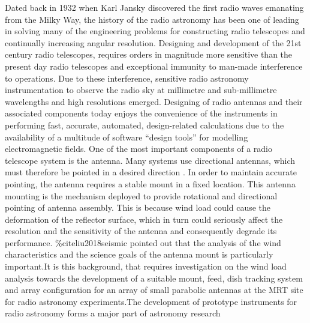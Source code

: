 {Dated back in 1932 \cite{jansky1933radio} 
when Karl Jansky discovered the first radio waves emanating from the Milky Way, the history of the radio astronomy has been one of leading in solving many of the engineering problems for constructing radio telescopes and  continually increasing angular resolution.
Designing and development of the 21st century radio telescopes, requires orders in magnitude more sensitive than the present day radio telescopes and exceptional immunity to man-made interference to operations. %
Due to these interference, sensitive radio astronomy instrumentation to observe the radio sky at millimetre and sub-millimetre wavelengths and high resolutions emerged.
Designing of radio antennas and their associated components today enjoys the convenience of the instruments in performing fast, accurate, automated, design-related calculations due to the availability of a multitude of software “design tools'' for modelling electromagnetic fields.
 One of the most important components of a radio telescope system is the antenna. Many systems use directional antennas, which must therefore be pointed in a desired direction \cite{smith2012antenna}. 
 In order to maintain accurate pointing, the antenna requires a stable mount in a fixed location. This antenna mounting is the mechanism deployed to provide rotational and directional pointing of antenna assembly. This is because wind load could cause the deformation of the reflector surface, which in turn could seriously affect the resolution and the sensitivity of the antenna and consequently degrade its performance. \%cite{liu2018seismic}
 pointed out that the analysis of the wind characteristics and the science goals of the antenna mount is particularly important.It is this background, that requires investigation on the wind load analysis towards the development of a suitable mount, feed, dish tracking system and array configuration for an array of small parabolic antennas at the MRT site for radio astronomy experiments.The development of prototype instruments for radio astronomy forms a major part of astronomy research
 
}
